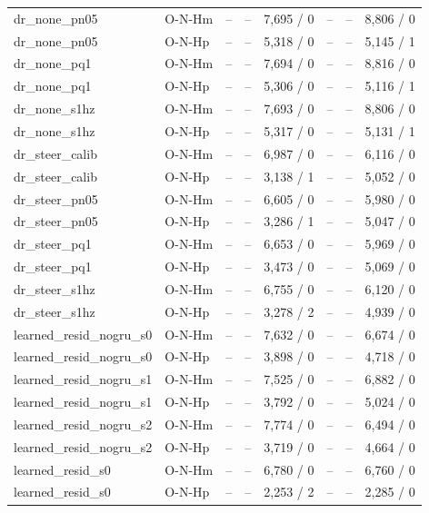 \begin{table}[t]
\begin{tabular}{llrrrrrr}
dr\_none\_pn05 & O-N-Hm & -- & -- & 7{,}695 / 0 & -- & -- & 8{,}806 / 0 \\
dr\_none\_pn05 & O-N-Hp & -- & -- & 5{,}318 / 0 & -- & -- & 5{,}145 / 1 \\
dr\_none\_pq1 & O-N-Hm & -- & -- & 7{,}694 / 0 & -- & -- & 8{,}816 / 0 \\
dr\_none\_pq1 & O-N-Hp & -- & -- & 5{,}306 / 0 & -- & -- & 5{,}116 / 1 \\
dr\_none\_s1hz & O-N-Hm & -- & -- & 7{,}693 / 0 & -- & -- & 8{,}806 / 0 \\
dr\_none\_s1hz & O-N-Hp & -- & -- & 5{,}317 / 0 & -- & -- & 5{,}131 / 1 \\
dr\_steer\_calib & O-N-Hm & -- & -- & 6{,}987 / 0 & -- & -- & 6{,}116 / 0 \\
dr\_steer\_calib & O-N-Hp & -- & -- & 3{,}138 / 1 & -- & -- & 5{,}052 / 0 \\
dr\_steer\_pn05 & O-N-Hm & -- & -- & 6{,}605 / 0 & -- & -- & 5{,}980 / 0 \\
dr\_steer\_pn05 & O-N-Hp & -- & -- & 3{,}286 / 1 & -- & -- & 5{,}047 / 0 \\
dr\_steer\_pq1 & O-N-Hm & -- & -- & 6{,}653 / 0 & -- & -- & 5{,}969 / 0 \\
dr\_steer\_pq1 & O-N-Hp & -- & -- & 3{,}473 / 0 & -- & -- & 5{,}069 / 0 \\
dr\_steer\_s1hz & O-N-Hm & -- & -- & 6{,}755 / 0 & -- & -- & 6{,}120 / 0 \\
dr\_steer\_s1hz & O-N-Hp & -- & -- & 3{,}278 / 2 & -- & -- & 4{,}939 / 0 \\
learned\_resid\_nogru\_s0 & O-N-Hm & -- & -- & 7{,}632 / 0 & -- & -- & 6{,}674 / 0 \\
learned\_resid\_nogru\_s0 & O-N-Hp & -- & -- & 3{,}898 / 0 & -- & -- & 4{,}718 / 0 \\
learned\_resid\_nogru\_s1 & O-N-Hm & -- & -- & 7{,}525 / 0 & -- & -- & 6{,}882 / 0 \\
learned\_resid\_nogru\_s1 & O-N-Hp & -- & -- & 3{,}792 / 0 & -- & -- & 5{,}024 / 0 \\
learned\_resid\_nogru\_s2 & O-N-Hm & -- & -- & 7{,}774 / 0 & -- & -- & 6{,}494 / 0 \\
learned\_resid\_nogru\_s2 & O-N-Hp & -- & -- & 3{,}719 / 0 & -- & -- & 4{,}664 / 0 \\
learned\_resid\_s0 & O-N-Hm & -- & -- & 6{,}780 / 0 & -- & -- & 6{,}760 / 0 \\
learned\_resid\_s0 & O-N-Hp & -- & -- & 2{,}253 / 2 & -- & -- & 2{,}285 / 0 \\

\end{tabular}
\end{table}
